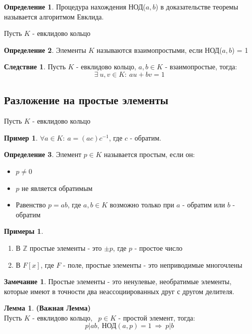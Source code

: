 \documentclass[a4paper, 12pt]{article}
\newcommand{\Z}{\mathbb Z}
\newcommand\tab[1][.5cm]{\hspace*{#1}}
\newcounter{lemcount}
\newcounter{lemcount2}
\theoremstyle{definition}
\newtheorem*{definition}{Определение}
\newtheorem*{consequense}{Следствие}
\newtheorem*{remark}{Замечание}
\newtheorem*{example}{Примеры}
\newtheorem*{example1}{Пример}
\newtheorem{lemmanum}[lemcount]{Лемма}
\begin{document}
  \begin{definition}
    Процедура нахождения НОД($a,b$) в доказательстве теоремы называется алгоритмом Евклида.
  \end{definition}
  Пусть $K$ - евклидово кольцо
  \begin{definition}
    Элементы $K$ называются взаимопростыми, если НОД($a,b$) = 1  
  \end{definition}
  \begin{consequense}
    Пусть $K$ - евклидово кольцо, $a, b \in K$ - взаимопростые, тогда:
    $$\exists \ u, v \in K: \ au+bv=1$$  
  \end{consequense}
  \subsection{Разложение на простые элементы}
  Пусть $K$ - евклидово кольцо
  \begin{example1}
    $\forall a \in K: \ a = (ac)c^{-1}$, где $c$ - обратим.  
  \end{example1}
  \begin{definition}
    Элемент $p \in K$ называется простым, если он:
    \begin{itemize}
      \item[1)] $p\neq 0$
      \item[2)] $p$ не является обратимым
      \item[3)] Равенство $p = ab$, где $a, b \in K$ возможно только при $a$ - обратим или $b$ - обратим    
    \end{itemize}
  \end{definition}
  \begin{example}\tab
    \begin{enumerate}
      \item В $\Z$ простые элементы - это $\pm p$, где $p$ - простое число
      \item В $F[x]$, где $F$ - поле, простые элементы  - это неприводимые многочлены  
    \end{enumerate}
  \end{example}
  \begin{remark}
  Простые элементы - это ненулевые, необратимые элементы, которые имеют в точности два неассоциированных друг с другом делителя.
  \end{remark}
  \setcounter{lemcount}{0}
  \begin{lemmanum} \textbf{(Важная Лемма)}\\
    Пусть $K$ - евклидово кольцо, \ $p \in K$ - простой элемент, тогда:
    $$p|ab, \ \text{НОД}(a,p) = 1 \ \Longrightarrow \ p|b$$ 
  \end{lemmanum}
\end{document}
